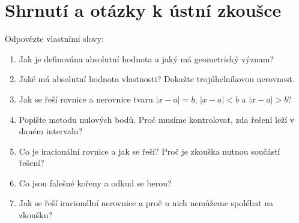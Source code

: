 \section{Shrnutí a otázky k ústní zkoušce}

\begin{problem}
  Odpovězte vlastními slovy:
  \begin{enumerate}
    \item Jak je definována absolutní hodnota a jaký má geometrický význam?
    \item Jaké má absolutní hodnota vlastnosti? Dokažte trojúhelníkovou nerovnost.
    \item Jak se řeší rovnice a nerovnice tvaru $|x - a| = b$, $|x - a| < b$ a $|x - a| > b$?
    \item Popište metodu nulových bodů. Proč musíme kontrolovat, zda řešení leží v daném intervalu?
    \item Co je iracionální rovnice a jak se řeší? Proč je zkouška nutnou součástí řešení?
    \item Co jsou falešné kořeny a odkud se berou?
    \item Jak se řeší iracionální nerovnice a proč u nich nemůžeme spoléhat na zkoušku?
  \end{enumerate}
\end{problem}
